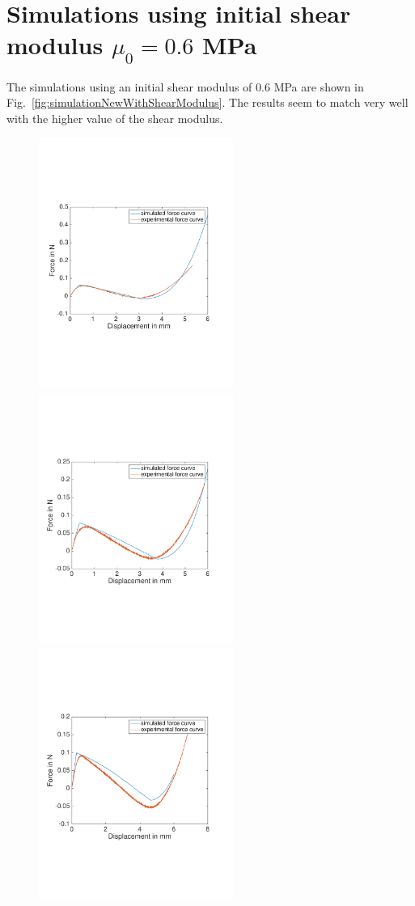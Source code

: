 \documentclass[10pt]{article}
\begin{document}
\section{Simulations using initial shear modulus $\mu_0 = 0.6$ MPa}
The simulations using an initial shear modulus of $0.6$ MPa are shown in Fig.~\ref{fig:simulationNewWithShearModulus}. The results seem to match very well with the higher value of the shear modulus. 
\begin{figure}[h]
\centering
\includegraphics[width=2.5in]{22p2ShearModulusp2}
\includegraphics[width=2.5in]{26p2ShearModulusp2}
\includegraphics[width=2.5in]{32p3ShearModulusp2}

\end{figure}
\end{document}
